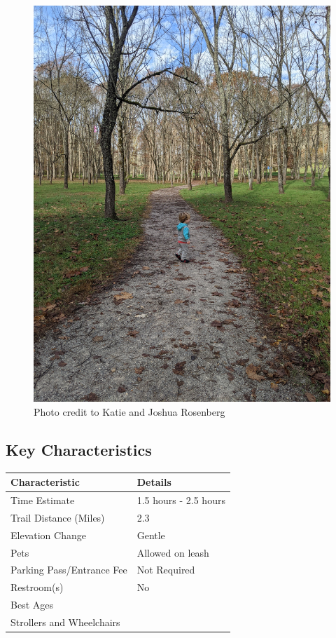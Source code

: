 \documentclass[
  letterpaper,
  DIV=11,
  numbers=noendperiod]{scrreprt}
\begin{document}
\begin{figure}[H]

{\centering \includegraphics[width=6.25in,height=\textheight,keepaspectratio]{img/trail-11-figure-01.jpg}

}

\caption{Photo credit to Katie and Joshua Rosenberg}

\end{figure}%

\subsection{Key Characteristics}\label{key-characteristics-10}

\begin{longtable}[]{@{}ll@{}}
\toprule\noalign{}
\textbf{Characteristic} & \textbf{Details} \\
\midrule\noalign{}
\endhead
\bottomrule\noalign{}
\endlastfoot
Time Estimate & 1.5 hours - 2.5 hours \\
Trail Distance (Miles) & 2.3 \\
Elevation Change & Gentle \\
Pets & Allowed on leash \\
Parking Pass/Entrance Fee & Not Required \\
Restroom(s) & No \\
Best Ages & \\
Strollers and Wheelchairs & \\
\end{longtable}
\end{document}
